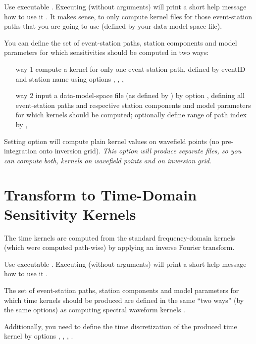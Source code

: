 Use executable . Executing  (without arguments) 
will print a short help message how to use it .
It makes sense, to only compute kernel files for those event-station paths that you are going to use (defined by
your data-model-space file).

You can define the set of event-station paths, station components and model parameters for which 
sensitivities should be computed in two ways:
\begin{itemize}
\item[way 1] compute a kernel for only one event-station path, defined by eventID and station name using options 
, , , 
\item[way 2] input a data-model-space file (as defined by ) by option 
, defining all event-station paths and respective station components and model parameters 
for which kernels should be computed; optionally define range of path index
by , 
\end{itemize}
Setting option  will compute plain kernel values on wavefield points (no pre-integration onto inversion
grid). \emph{This option will produce separate files, so you can compute both, kernels on wavefield points and
on inversion grid}.
%
\section{Transform to Time-Domain Sensitivity Kernels} \label{basic_steps,sec:compute_time_kernels}
%
The time kernels are computed from the standard frequency-domain kernels (which were computed path-wise)
by applying an inverse Fourier transform. 

Use executable . Executing  (without arguments) will print a short
help message how to use it .

The set of event-station paths, station components and model parameters for which time kernels should be produced
are defined in the same ``two ways'' (by the same options) as computing spectral waveform kernels 
.

Additionally, you need to define the time discretization of the produced time kernel by options 
, , , .
%
